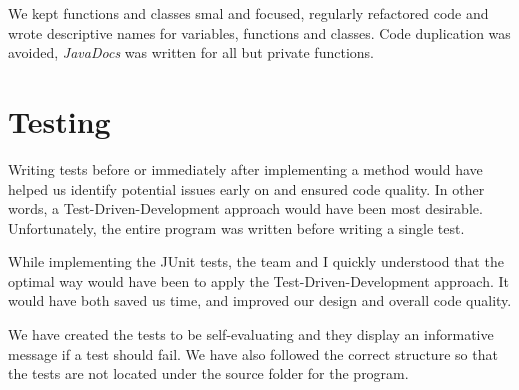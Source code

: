 \documentclass[a4paper]{scrreprt}
\begin{document}
We kept functions and classes smal and focused, regularly refactored code and wrote descriptive names for
variables, functions and classes.
Code duplication was avoided, \emph{JavaDocs} was written for all but private functions.

\section*{Testing}
\label{sec:testing}
Writing tests before or immediately after implementing a method would have helped us identify
potential issues early on and ensured code quality.
In other words, a Test-Driven-Development approach would have been most desirable.
Unfortunately, the entire program was written before writing a single test.

While implementing the JUnit tests, the team and I quickly understood that
the optimal way would have been to apply the Test-Driven-Development approach.
It would have both saved us time, and improved our design and overall code quality.

We have created the tests to be self-evaluating and they display an informative message
if a test should fail.
We have also followed the correct structure so that the
tests are not located under the source folder for the program.

\end{document}
